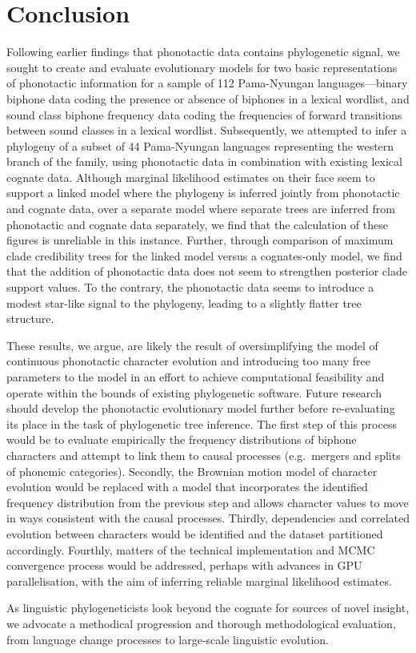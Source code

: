 \hypertarget{pn-tree-conclusion}{%
\section{Conclusion}\label{pn-tree-conclusion}}

Following earlier findings that phonotactic data contains phylogenetic signal, we sought to create and evaluate evolutionary models for two basic representations of phonotactic information for a sample of 112 Pama-Nyungan languages---binary biphone data coding the presence or absence of biphones in a lexical wordlist, and sound class biphone frequency data coding the frequencies of forward transitions between sound classes in a lexical wordlist. Subsequently, we attempted to infer a phylogeny of a subset of 44 Pama-Nyungan languages representing the western branch of the family, using phonotactic data in combination with existing lexical cognate data. Although marginal likelihood estimates on their face seem to support a linked model where the phylogeny is inferred jointly from phonotactic and cognate data, over a separate model where separate trees are inferred from phonotactic and cognate data separately, we find that the calculation of these figures is unreliable in this instance. Further, through comparison of maximum clade credibility trees for the linked model versus a cognates-only model, we find that the addition of phonotactic data does not seem to strengthen posterior clade support values. To the contrary, the phonotactic data seems to introduce a modest star-like signal to the phylogeny, leading to a slightly flatter tree structure.

These results, we argue, are likely the result of oversimplifying the model of continuous phonotactic character evolution and introducing too many free parameters to the model in an effort to achieve computational feasibility and operate within the bounds of existing phylogenetic software. Future research should develop the phonotactic evolutionary model further before re-evaluating its place in the task of phylogenetic tree inference. The first step of this process would be to evaluate empirically the frequency distributions of biphone characters and attempt to link them to causal processes (e.g.~mergers and splits of phonemic categories). Secondly, the Brownian motion model of character evolution would be replaced with a model that incorporates the identified frequency distribution from the previous step and allows character values to move in ways consistent with the causal processes. Thirdly, dependencies and correlated evolution between characters would be identified and the dataset partitioned accordingly. Fourthly, matters of the technical implementation and MCMC convergence process would be addressed, perhaps with advances in GPU parallelisation, with the aim of inferring reliable marginal likelihood estimates.

As linguistic phylogeneticists look beyond the cognate for sources of novel insight, we advocate a methodical progression and thorough methodological evaluation, from language change processes to large-scale linguistic evolution.

